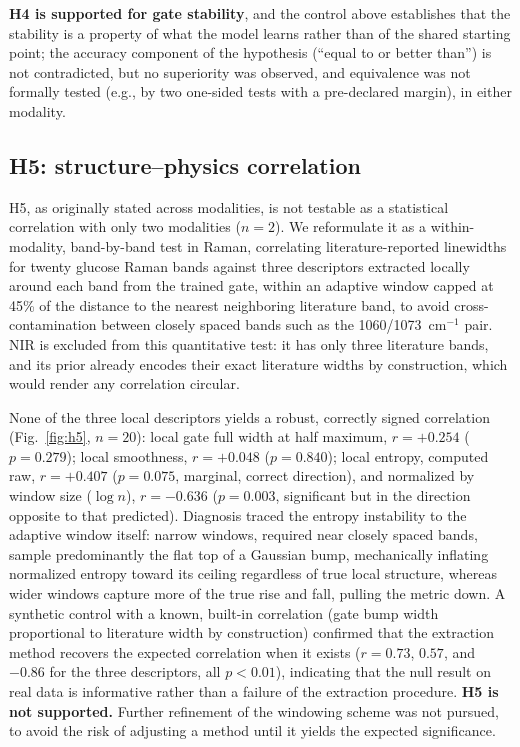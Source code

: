 \documentclass[preprint,12pt]{elsarticle}
\begin{document}
\textbf{H4 is supported for gate stability}, and the control above establishes that the stability is a property of what the model learns rather than of the shared starting point; the accuracy component of the hypothesis (``equal to or better than'') is not contradicted, but no superiority was observed, and equivalence was not formally tested (e.g., by two one-sided tests with a pre-declared margin), in either modality.

\subsection{H5: structure--physics correlation}
\label{sec:results-h5}

H5, as originally stated across modalities, is not testable as a statistical correlation with only two modalities ($n=2$). We reformulate it as a within-modality, band-by-band test in Raman, correlating literature-reported linewidths for twenty glucose Raman bands \cite{uspatent2024} against three descriptors extracted locally around each band from the trained gate, within an adaptive window capped at 45\% of the distance to the nearest neighboring literature band, to avoid cross-contamination between closely spaced bands such as the 1060/1073~cm$^{-1}$ pair. NIR is excluded from this quantitative test: it has only three literature bands, and its prior already encodes their exact literature widths by construction, which would render any correlation circular.

None of the three local descriptors yields a robust, correctly signed correlation (Fig.~\ref{fig:h5}, $n=20$): local gate full width at half maximum, $r=+0.254$ ($p=0.279$); local smoothness, $r=+0.048$ ($p=0.840$); local entropy, computed raw, $r=+0.407$ ($p=0.075$, marginal, correct direction), and normalized by window size ($\log n$), $r=-0.636$ ($p=0.003$, significant but in the direction opposite to that predicted). Diagnosis traced the entropy instability to the adaptive window itself: narrow windows, required near closely spaced bands, sample predominantly the flat top of a Gaussian bump, mechanically inflating normalized entropy toward its ceiling regardless of true local structure, whereas wider windows capture more of the true rise and fall, pulling the metric down. A synthetic control with a known, built-in correlation (gate bump width proportional to literature width by construction) confirmed that the extraction method recovers the expected correlation when it exists ($r=0.73$, $0.57$, and $-0.86$ for the three descriptors, all $p<0.01$), indicating that the null result on real data is informative rather than a failure of the extraction procedure. \textbf{H5 is not supported.} Further refinement of the windowing scheme was not pursued, to avoid the risk of adjusting a method until it yields the expected significance.
\end{document}
